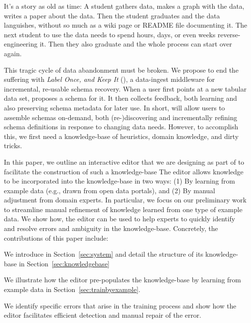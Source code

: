 
It's a story as old as time: A student gathers data, makes a graph with the data, writes a paper about the data.
Then the student graduates and the data languishes, without so much as a wiki page or README file documenting it.
The next student to use the data needs to spend hours, days, or even weeks reverse-engineering it.
Then they also graduate and the whole process can start over again.

This tragic cycle of data abandonment must be broken.
We propose to end the suffering with \emph{Label Once, and Keep It} (\systemname), a data-ingest middleware for incremental, re-usable schema recovery.
When a user first points \systemname at a new tabular data set, \systemname proposes a schema for it.
It then collects feedback, both learning and also preserving schema metadata for later use.
In short, \systemname will allow users to assemble schemas on-demand, both (re-)discovering and incrementally refining schema definitions in response to changing data needs.
However, to accomplish this, we first need a knowledge-base of heuristics, domain knowledge, and dirty tricks.

In this paper, we outline an interactive editor that we are designing as part of \systemname to facilitate the construction of such a knowledge-base
The \systemname editor allows knowledge to be incorporated into the knowledge-base in two ways: (1) By learning from example data (e.g., drawn from open data portals), and (2) By manual adjustment from domain experts.
In particular, we focus on our preliminary work to streamline manual refinement of knowledge learned from one type of example data.
We show how, the editor can be used to help experts to quickly identify and resolve errors and ambiguity in the \systemname knowledge-base.
Concretely, the contributions of this paper include:
\begin{enumerate*}
  \item We introduce \systemname in Section~\ref{sec:system} and detail the structure of its knowledge-base in Section~\ref{sec:knowledgebase}
  \item We illustrate how the \systemname editor pre-populates the knowledge-base by learning from example data in Section~\ref{sec:trainbyexample}.
  \item We identify specific errors that arise in the training process and show how the \systemname editor facilitates efficient detection and manual repair of the error.
\end{enumerate*}

